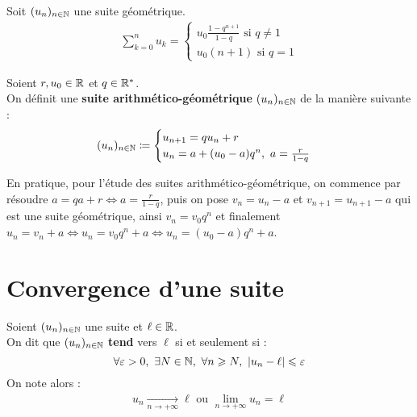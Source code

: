 \begin{proposition}
    Soit $(u_n)_{n \in \mathbb{N}}$ une suite géométrique.
    \begin{align*}
        \sum_{k = 0}^{n} u_k = 
        \begin{cases}
            u_0 \frac{1 - q^{n+1}}{1 - q} \text{ si } q \neq 1\\
            u_0(n+1) \text{ si } q = 1
        \end{cases}
    \end{align*}
\end{proposition}

\begin{definition}
    Soient $r, u_0 \in \mathbb{R}$ et $q \in \mathbb{R}^*$. 
    \\
    On définit une \textbf{suite arithmético-géométrique} $(u_n)_{n \in \mathbb{N}}$ de la manière suivante :
    \begin{align*}
        (u_n)_{n \in \mathbb{N}} \coloneqq 
        \begin{cases}
            u_{n+1} = qu_n + r \\ 
            u_n = a + (u_0 - a) q^n,\ a = \frac{r}{1 - q}
        \end{cases}
    \end{align*}
\end{definition}

En pratique, pour l'étude des suites arithmético-géométrique, on commence par résoudre $a = qa + r \iff a = \frac{r}{1 - q}$, puis on pose $v_n = u_n - a$ et $v_{n+1} = u_{n+1} - a$ qui est une suite géométrique, ainsi $v_n = v_0 q^n$ et finalement $u_n = v_n + a \iff u_n = v_0 q^n + a \iff u_n = (u_0 - a) q^n + a$.

\section{Convergence d'une suite}
\begin{definition}
    Soient $(u_n)_{n \in \mathbb{N}}$ une suite et $\ell \in \mathbb{R}$. 
    \\
    On dit que $(u_n)_{n \in \mathbb{N}}$ \textbf{tend} vers $\ell$ si et seulement si :
    \[ \forall \varepsilon > 0,\ \exists N \in \mathbb{N},\ \forall n \geqslant N,\ \abs{u_n - \ell} \leqslant \varepsilon \]
    On note alors :
    \begin{align*}
        u_n \xrightarrow[n \to +\infty]{} \ell \text{ ou } \lim_{n \to +\infty} u_n = \ell
    \end{align*}
\end{definition}

